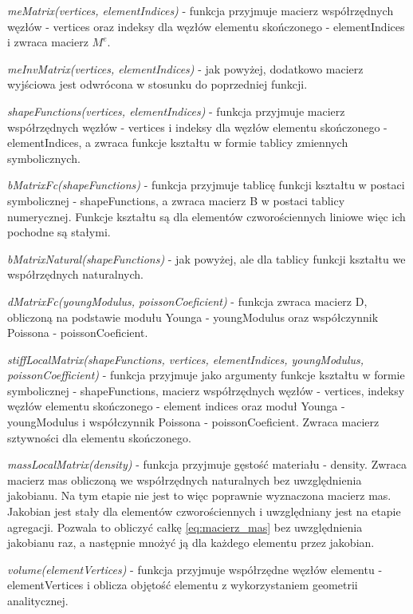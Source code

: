\vspace {3mm}
\textit{meMatrix(vertices, elementIndices)} - funkcja przyjmuje macierz współrzędnych węzłów - vertices oraz indeksy dla węzłów elementu skończonego - elementIndices i zwraca macierz \( M^e \).

\vspace {3mm}
\textit{meInvMatrix(vertices, elementIndices)} - jak powyżej, dodatkowo macierz wyjściowa jest odwrócona w stosunku do poprzedniej funkcji.

\vspace {3mm}
\textit{shapeFunctions(vertices, elementIndices)} - funkcja przyjmuje macierz współrzędnych węzłów - vertices i indeksy dla węzłów elementu skończonego - elementIndices, a zwraca funkcje kształtu w formie tablicy zmiennych symbolicznych.

\vspace {3mm}
\textit{bMatrixFc(shapeFunctions)} - funkcja przyjmuje tablicę funkcji kształtu w postaci symbolicznej - shapeFunctions, a zwraca macierz B w postaci tablicy numerycznej. Funkcje kształtu są dla elementów czworościennych liniowe więc ich pochodne są stałymi. 

\vspace {3mm}
\textit{bMatrixNatural(shapeFunctions)} - jak powyżej, ale dla tablicy funkcji kształtu we współrzędnych naturalnych.

\vspace {3mm}
\textit{dMatrixFc(youngModulus, poissonCoeficient)} - funkcja zwraca macierz D, obliczoną na podstawie modułu Younga - youngModulus oraz współczynnik Poissona - poissonCoeficient.

\vspace {3mm}
\textit{stiffLocalMatrix(shapeFunctions, vertices, elementIndices, youngModulus, poissonCoefficient)} - funkcja przyjmuje jako argumenty funkcje kształtu w formie symbolicznej - shapeFunctions, macierz współrzędnych węzłów - vertices, indeksy węzłów elementu skończonego - element indices oraz moduł Younga - youngModulus i współczynnik Poissona - poissonCoeficient. Zwraca macierz sztywności dla elementu skończonego.

\vspace {3mm}
\textit{massLocalMatrix(density)} - funkcja przyjmuje gęstość materiału - density. Zwraca macierz mas obliczoną we współrzędnych naturalnych bez uwzględnienia jakobianu. Na tym etapie nie jest to więc poprawnie wyznaczona macierz mas. Jakobian jest stały dla elementów czworościennych i uwzględniany jest na etapie agregacji. Pozwala to obliczyć całkę \ref{eq:macierz_mas} bez uwzględnienia jakobianu raz, a następnie mnożyć ją dla każdego elementu przez jakobian.

\vspace {3mm}
\textit{volume(elementVertices)} - funkcja przyjmuje współrzędne węzłów elementu - elementVertices i oblicza objętość elementu z wykorzystaniem geometrii analitycznej.

